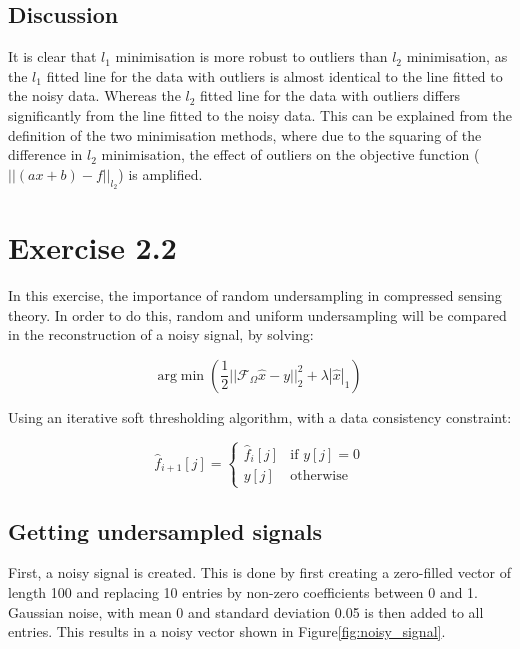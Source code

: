 \documentclass[12pt]{report} %
\begin{document}
\subsection{Discussion}

It is clear that $l_{1}$ minimisation is more robust to outliers than $l_{2}$ minimisation, as the $l_{1}$ fitted line for the data with outliers is almost identical to the line fitted to the noisy data. Whereas the $l_{2}$ fitted line for the data with outliers differs significantly from the line fitted to the noisy data. This can be explained from the definition of the two minimisation methods, where due to the squaring of the difference in $l_{2}$ minimisation, the effect of outliers on the objective function ($||(ax + b) - f||_{l_{2}}$) is amplified.

\section{Exercise 2.2}

In this exercise, the importance of random undersampling in compressed sensing theory. In order to do this, random and uniform undersampling will be compared in the reconstruction of a noisy signal, by solving:

\begin{equation}
    \text{arg} \min{(\frac{1}{2}||\mathcal{F}_{\Omega}\hat{x} - y||^{2}_{2} + \lambda |\hat{x}|_{1})}
\end{equation}


Using an iterative soft thresholding algorithm, with a data consistency constraint:

\begin{equation}
    \hat{f}_{i+1}[j] =
    \begin{cases}
        \hat{f}_{i}[j] & \text{if } y[j] = 0 \\
        y[j] & \text{otherwise}
    \end{cases}
\end{equation}

\subsection{Getting undersampled signals}

First, a noisy signal is created. This is done by first creating a zero-filled vector of length 100 and replacing 10 entries by non-zero coefficients between 0 and 1. Gaussian noise, with mean 0 and standard deviation 0.05 is then added to all entries. This results in a noisy vector shown in Figure\ref{fig:noisy_signal}.
\end{document}
